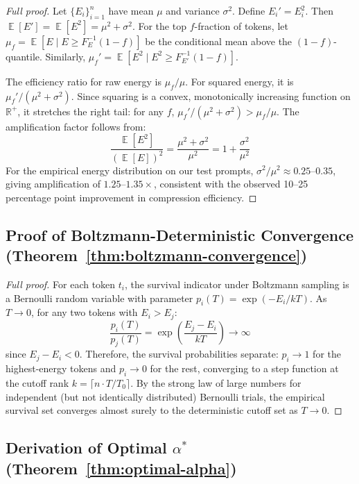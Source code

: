 \documentclass[11pt]{article}
\theoremstyle{remark}
\DeclareMathOperator{\E}{\mathbb{E}}
\newcommand{\R}{\mathbb{R}}
\begin{document}
\begin{proof}[Full proof]
Let $\{E_i\}_{i=1}^n$ have mean $\mu$ and variance $\sigma^2$.
Define $E_i' = E_i^2$. Then $\E[E'] = \E[E^2] = \mu^2 + \sigma^2$.
For the top $f$-fraction of tokens, let $\mu_f = \E[E \mid E \geq
F_E^{-1}(1-f)]$ be the conditional mean above the $(1-f)$-quantile.
Similarly, $\mu_f' = \E[E^2 \mid E^2 \geq F_{E'}^{-1}(1-f)]$.

The efficiency ratio for raw energy is $\mu_f / \mu$. For squared energy,
it is $\mu_f' / (\mu^2 + \sigma^2)$. Since squaring is a convex,
monotonically increasing function on $\R^+$, it stretches the right tail:
for any $f$, $\mu_f' / (\mu^2 + \sigma^2) > \mu_f / \mu$. The amplification
factor follows from:
\begin{equation}
    \frac{\E[E^2]}{(\E[E])^2} = \frac{\mu^2 + \sigma^2}{\mu^2}
    = 1 + \frac{\sigma^2}{\mu^2}
\end{equation}
For the empirical energy distribution on our test prompts,
$\sigma^2/\mu^2 \approx 0.25$--$0.35$, giving amplification of
$1.25$--$1.35\times$, consistent with the observed 10--25 percentage
point improvement in compression efficiency.
\end{proof}

\subsection{Proof of Boltzmann-Deterministic Convergence (Theorem~\ref{thm:boltzmann-convergence})}

\begin{proof}[Full proof]
For each token $t_i$, the survival indicator under Boltzmann sampling is a
Bernoulli random variable with parameter $p_i(T) = \exp(-E_i/kT)$.
As $T \to 0$, for any two tokens with $E_i > E_j$:
\begin{equation}
    \frac{p_i(T)}{p_j(T)} = \exp\left(\frac{E_j - E_i}{kT}\right) \to \infty
\end{equation}
since $E_j - E_i < 0$. Therefore, the survival probabilities separate:
$p_i \to 1$ for the highest-energy tokens and $p_i \to 0$ for the rest,
converging to a step function at the cutoff rank $k = \lceil n \cdot
T/T_0 \rceil$. By the strong law of large numbers for independent (but not
identically distributed) Bernoulli trials, the empirical survival set
converges almost surely to the deterministic cutoff set as $T \to 0$.
\end{proof}

\subsection{Derivation of Optimal $\alpha^*$ (Theorem~\ref{thm:optimal-alpha})}
\end{document}
